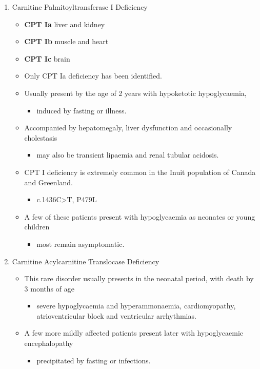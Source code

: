 \documentclass{scrartcl}
\begin{document}
\begin{enumerate}
\item Carnitine Palmitoyltransferase I Deficiency
\label{sec:orgde77a85}
\begin{itemize}
\item \textbf{CPT Ia} liver and kidney
\item \textbf{CPT Ib}  muscle and heart
\item \textbf{CPT Ic}  brain

\item Only CPT Ia deficiency has been identified.
\item Usually present by the age of 2 years with hypoketotic hypoglycaemia,
\begin{itemize}
\item induced by fasting or illness.
\end{itemize}
\item Accompanied by hepatomegaly, liver dysfunction and occasionally cholestasis
\begin{itemize}
\item may also be transient lipaemia and renal tubular acidosis.
\end{itemize}
\item CPT I deficiency is extremely common in the Inuit population of Canada and Greenland.
\begin{itemize}
\item c.1436C>T, P479L
\end{itemize}
\item A few of these patients present with hypoglycaemia as neonates or young children
\begin{itemize}
\item most remain asymptomatic.
\end{itemize}
\end{itemize}

\item Carnitine Acylcarnitine Translocase Deficiency
\label{sec:org95844a0}

\begin{itemize}
\item This rare disorder usually presents in the neonatal period, with
death by 3 months of age
\begin{itemize}
\item severe hypoglycaemia and hyperammonaemia, cardiomyopathy,
atrioventricular block and ventricular arrhythmias.
\end{itemize}
\item A few more mildly affected patients present later with hypoglycaemic
encephalopathy
\begin{itemize}
\item precipitated by fasting or infections.
\end{itemize}
\end{itemize}


\end{enumerate}
\end{document}
